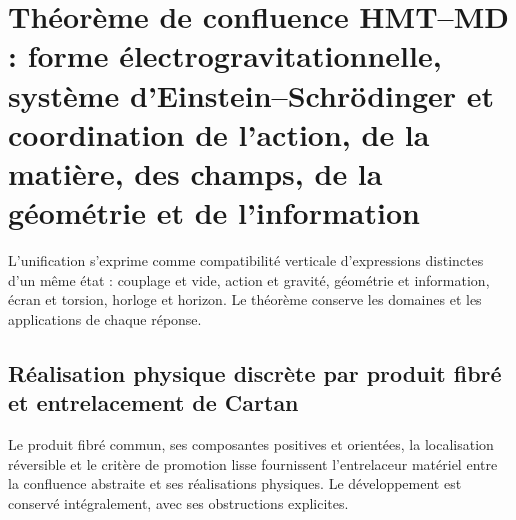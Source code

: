 \chapter{Théorème de confluence HMT–MD : forme électrogravitationnelle, système d’Einstein–Schrödinger et coordination de l’action, de la matière, des champs, de la géométrie et de l’information}
\label{chap:parte-iv-51}

L’unification s’exprime comme compatibilité verticale d’expressions distinctes d’un même état : couplage et vide, action et gravité, géométrie et information, écran et torsion, horloge et horizon. Le théorème conserve les domaines et les applications de chaque réponse.



\section{Réalisation physique discrète par produit fibré et entrelacement de Cartan}

Le produit fibré commun, ses composantes positives et orientées, la localisation réversible et le critère de promotion lisse fournissent l’entrelaceur matériel entre la confluence abstraite et ses réalisations physiques. Le développement est conservé intégralement, avec ses obstructions explicites.

\begingroup
\let\chapter\section
\let\section\subsection
\let\subsection\subsubsection
\let\subsubsection\paragraph
\let\clearpage\relax
\let\cleardoublepage\relax

\endgroup

